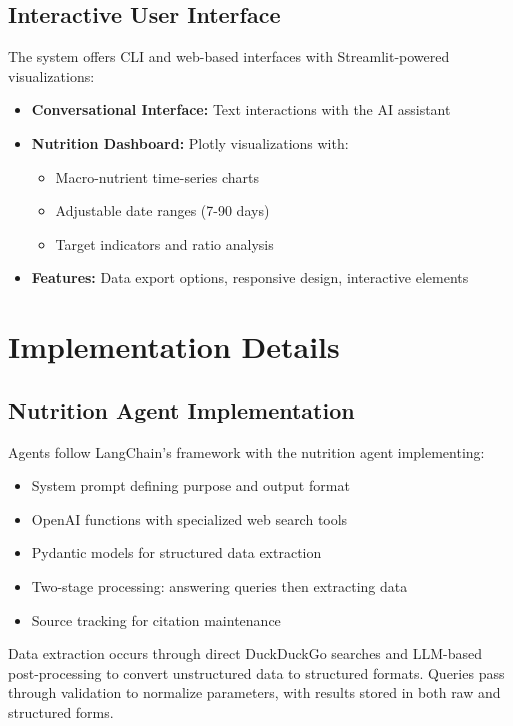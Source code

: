 \documentclass{ecai}
\begin{document}
\subsection{Interactive User Interface}

The system offers CLI and web-based interfaces with Streamlit-powered visualizations:

\begin{itemize}[noitemsep,topsep=0pt]
    \item \textbf{Conversational Interface:} Text interactions with the AI assistant
    \item \textbf{Nutrition Dashboard:} Plotly visualizations with:
      \begin{itemize}[noitemsep,topsep=0pt]
        \item Macro-nutrient time-series charts
        \item Adjustable date ranges (7-90 days)
        \item Target indicators and ratio analysis
      \end{itemize}
    \item \textbf{Features:} Data export options, responsive design, interactive elements
\end{itemize}

\section{Implementation Details}

\subsection{Nutrition Agent Implementation}

Agents follow LangChain's framework with the nutrition agent implementing:
\begin{itemize}[noitemsep,topsep=0pt]
    \item System prompt defining purpose and output format
    \item OpenAI functions with specialized web search tools
    \item Pydantic models for structured data extraction
    \item Two-stage processing: answering queries then extracting data
    \item Source tracking for citation maintenance
\end{itemize}

Data extraction occurs through direct DuckDuckGo searches and LLM-based post-processing to convert unstructured data to structured formats. Queries pass through validation to normalize parameters, with results stored in both raw and structured forms.
\end{document}
